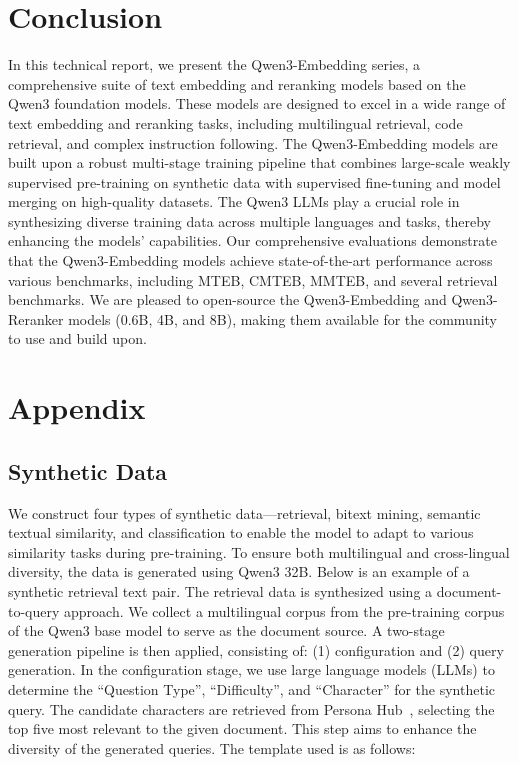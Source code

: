 \documentclass{article} %
\begin{document}
\section{Conclusion}
In this technical report, we present the Qwen3-Embedding series, a comprehensive suite of text embedding and reranking models based on the Qwen3 foundation models. These models are designed to excel in a wide range of text embedding and reranking tasks, including multilingual retrieval, code retrieval, and complex instruction following. The Qwen3-Embedding models are built upon a robust multi-stage training pipeline that combines large-scale weakly supervised pre-training on synthetic data with supervised fine-tuning and model merging on high-quality datasets. The Qwen3 LLMs play a crucial role in synthesizing diverse training data across multiple languages and tasks, thereby enhancing the models' capabilities. Our comprehensive evaluations demonstrate that the Qwen3-Embedding models achieve state-of-the-art performance across various benchmarks, including MTEB, CMTEB, MMTEB, and several retrieval benchmarks. We are pleased to open-source the Qwen3-Embedding and Qwen3-Reranker models (0.6B, 4B, and 8B), making them available for the community to use and build upon.




\clearpage
\appendix
\section{Appendix}

\subsection{Synthetic Data} \label{synthetic_data}
We construct four types of synthetic data—retrieval, bitext mining, semantic textual similarity, and classification to enable the model to adapt to various similarity tasks during pre-training. To ensure both multilingual and cross-lingual diversity, the data is generated using Qwen3 32B. Below is an example of a synthetic retrieval text pair. The retrieval data is synthesized using a document-to-query approach. We collect a multilingual corpus from the pre-training corpus of the Qwen3 base model to serve as the document source. A two-stage generation pipeline is then applied, consisting of: (1) configuration and (2) query generation. In the configuration stage, we use large language models (LLMs) to determine the ``Question Type'', ``Difficulty'', and ``Character'' for the synthetic query. The candidate characters are retrieved from Persona Hub~\citep{ge2024scaling}, selecting the top five most relevant to the given document. This step aims to enhance the diversity of the generated queries. The template used is as follows:
\end{document}

